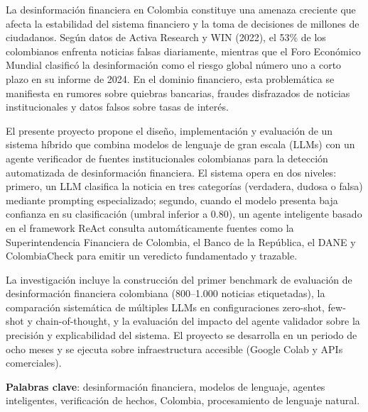 La desinformación financiera en Colombia constituye una amenaza creciente que afecta la estabilidad del sistema financiero y la toma de decisiones de millones de ciudadanos. Según datos de Activa Research y WIN (2022), el 53\% de los colombianos enfrenta noticias falsas diariamente, mientras que el Foro Económico Mundial clasificó la desinformación como el riesgo global número uno a corto plazo en su informe de 2024. En el dominio financiero, esta problemática se manifiesta en rumores sobre quiebras bancarias, fraudes disfrazados de noticias institucionales y datos falsos sobre tasas de interés.

El presente proyecto propone el diseño, implementación y evaluación de un sistema híbrido que combina modelos de lenguaje de gran escala (LLMs) con un agente verificador de fuentes institucionales colombianas para la detección automatizada de desinformación financiera. El sistema opera en dos niveles: primero, un LLM clasifica la noticia en tres categorías (verdadera, dudosa o falsa) mediante prompting especializado; segundo, cuando el modelo presenta baja confianza en su clasificación (umbral inferior a 0.80), un agente inteligente basado en el framework ReAct consulta automáticamente fuentes como la Superintendencia Financiera de Colombia, el Banco de la República, el DANE y ColombiaCheck para emitir un veredicto fundamentado y trazable.

La investigación incluye la construcción del primer benchmark de evaluación de desinformación financiera colombiana (800--1.000 noticias etiquetadas), la comparación sistemática de múltiples LLMs en configuraciones zero-shot, few-shot y chain-of-thought, y la evaluación del impacto del agente validador sobre la precisión y explicabilidad del sistema. El proyecto se desarrolla en un periodo de ocho meses y se ejecuta sobre infraestructura accesible (Google Colab y APIs comerciales).

\textbf{Palabras clave}: desinformación financiera, modelos de lenguaje, agentes inteligentes, verificación de hechos, Colombia, procesamiento de lenguaje natural.
